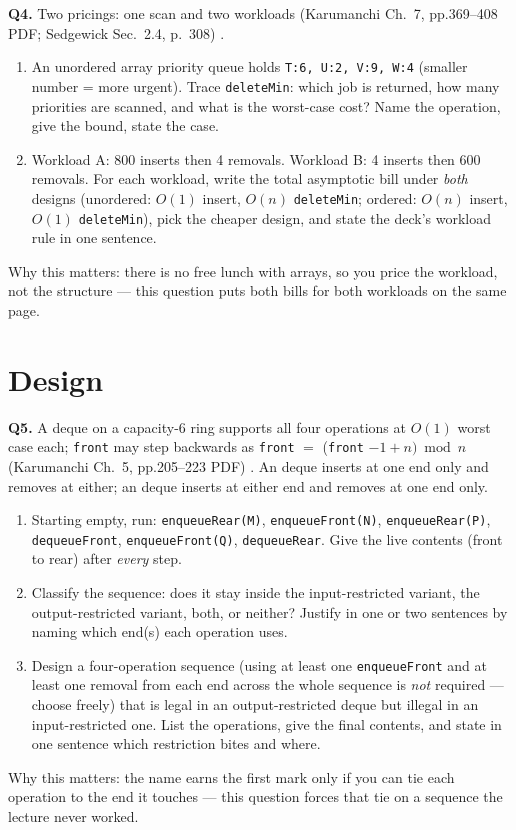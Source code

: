\documentclass[11pt]{article}
\begin{document}
\textbf{Q4.} Two pricings: one scan and two workloads (Karumanchi Ch.~7, pp.369--408 PDF; Sedgewick Sec.~2.4, p.~308) \cite{Karumanchi2017_data_structures_algorithms_made_easy,Sedgewick2011_algorithms}.
\begin{enumerate}
  \item[(a)] An unordered array priority queue holds \texttt{T:6, U:2, V:9, W:4} (smaller number = more urgent). Trace \texttt{deleteMin}: which job is returned, how many priorities are scanned, and what is the worst-case cost? Name the operation, give the bound, state the case.
  \item[(b)] Workload A: 800 inserts then 4 removals. Workload B: 4 inserts then 600 removals. For each workload, write the total asymptotic bill under \emph{both} designs (unordered: $O(1)$ insert, $O(n)$ \texttt{deleteMin}; ordered: $O(n)$ insert, $O(1)$ \texttt{deleteMin}), pick the cheaper design, and state the deck's workload rule in one sentence.
\end{enumerate}
Why this matters: there is no free lunch with arrays, so you price the workload, not the structure --- this question puts both bills for both workloads on the same page.

\section{Design}

\textbf{Q5.} A deque on a capacity-6 ring supports all four operations at $O(1)$ worst case each; \texttt{front} may step backwards as \texttt{front} $=$ (\texttt{front} $- 1 + n) \bmod n$ (Karumanchi Ch.~5, pp.205--223 PDF) \cite{Karumanchi2017_data_structures_algorithms_made_easy}. An  deque inserts at one end only and removes at either; an  deque inserts at either end and removes at one end only.
\begin{enumerate}
  \item[(a)] Starting empty, run: \texttt{enqueueRear(M)}, \texttt{enqueueFront(N)}, \texttt{enqueueRear(P)}, \texttt{dequeueFront}, \texttt{enqueueFront(Q)}, \texttt{dequeueRear}. Give the live contents (front to rear) after \emph{every} step.
  \item[(b)] Classify the sequence: does it stay inside the input-restricted variant, the output-restricted variant, both, or neither? Justify in one or two sentences by naming which end(s) each operation uses.
  \item[(c)] Design a four-operation sequence (using at least one \texttt{enqueueFront} and at least one removal from each end across the whole sequence is \emph{not} required --- choose freely) that is legal in an output-restricted deque but illegal in an input-restricted one. List the operations, give the final contents, and state in one sentence which restriction bites and where.
\end{enumerate}
Why this matters: the name earns the first mark only if you can tie each operation to the end it touches --- this question forces that tie on a sequence the lecture never worked.
\end{document}
